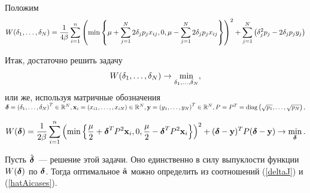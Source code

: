 Положим 
\begin{align}
	W(\idots \delta1N) 
	= \frac1{4\beta} \suml_{i=1}^n \cbr{\min\fbr{\mu + \suml_{j=1}^N2 \delta_j p_jx_{ij}, 0, \mu-\suml_{j=1}^N2 \delta_j p_jx_{ij}}}^2
		+ \suml_{j=1}^N \cbr{ \delta_j^2 p_j  - 2\delta_j p_j y_j}
\end{align}

Итак, достаточно решить задачу 
\begin{align}
	W(\idots \delta1N) \to \min_{\idots \delta1N},
\end{align}
или же, используя матричные обозначения $\mb \delta = \cbr{\idots \delta1N}^T \in \mathbb R^N, \mb x_i = \cbr{x_{i1}, \ldots, , x_{iN}} \in \mathbb R^N, \mb y = \cbr{\idots y1N}^T \in \mathbb R^N, P = P^T= \diag{\sqrt{p_1}, \ldots, \sqrt{p_N}},$

\begin{align}
	W(\mb \delta) = \frac1{2\beta} \suml_{i=1}^n \cbr{\min\fbr{\frac\mu2 + \mb \delta^T P^2\mb x_i, 0, \frac\mu2- \mb \delta^T P^2\mb x_i}}^2
		+ (\mb \delta - \mb y)^T P (\mb \delta - \mb y) \to \min_{\mb \delta}.
\end{align}

Пусть $\hat{\mb \delta}$~--- решение этой задачи. Оно единственно в силу выпуклости функции $W(\mb \delta)$ по $\mb \delta$. Тогда оптимальное $\hat{\mb a}$ можно определить из соотношений  (\ref{deltaJ}) и (\ref{hatAicases}).